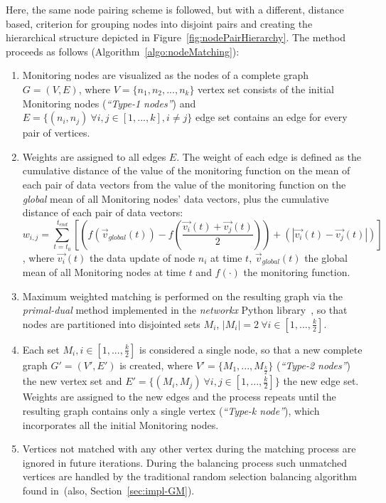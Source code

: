 Here, the same node pairing scheme is followed, but with a different, distance based, criterion for grouping nodes into disjoint pairs and creating the hierarchical structure depicted in Figure~\ref{fig:nodePairHierarchy}. The method proceeds as follows (Algorithm~\ref{algo:nodeMatching}):
\begin{enumerate}
\item Monitoring nodes are visualized as the nodes of a complete graph $G=(V,E)$, where $V=\{n_1, n_2, ... , n_k\}$ vertex set consists of the initial Monitoring nodes (\emph{``Type-1 nodes''}) and $E=\{(n_i, n_j)\ \forall i,j \in [1, ..., k], i \neq j\}$ edge set contains an edge for every pair of vertices.
\item Weights are assigned to all edges $E$. The weight of each edge is defined as the cumulative distance of the value of the monitoring function on the mean of each pair of data vectors from the value of the monitoring function on the \emph{global} mean of all Monitoring nodes' data vectors, plus the cumulative distance of each pair of data vectors:
\begin{equation}
w_{i,j}=
\sum_{t=t_0}^{t_{end}}{[(f(\vec{v}_{global}(t))-f(\frac{\vec{v_i}(t)+\vec{v_j}(t)}{2}))+(|\vec{v_i}(t)-\vec{v_j}(t)|)]}
\label{form:distanceMatchingWeights}
\end{equation}
, where $\vec{v_i}(t)$ the data update of node $n_i$ at time $t$, $\vec{v}_{global}(t)$ the global mean of all Monitoring nodes at time $t$ and $f(\cdot)$ the monitoring function.

\item Maximum weighted matching is performed on the resulting graph via the \emph{primal-dual} method implemented in the \emph{networkx} Python library~\cite{networkxMaxWeight}, so that nodes are partitioned into disjointed sets $M_i$, $|M_i|=2\ \forall i \in [1, ..., \frac{k}{2}]$. 

\item Each set $M_i, i \in [1, ..., \frac{k}{2}]$ is considered a single node, so that a new complete graph $G'=(V', E')$ is created, where $V'=\{M_1, ..., M_{\frac{k}{2}}\}$ (\emph{``Type-2 nodes''}) the new vertex set and $E'=\{(M_i, M_j)\ \forall i,j \in [1, ..., \frac{k}{2}]\}$ the new edge set. Weights are assigned to the new edges and the process repeats until the resulting graph contains only a single vertex (\emph{``Type-k node''}), which incorporates all the initial Monitoring nodes.

\item Vertices not matched with any other vertex during the matching process are ignored in future iterations. During the balancing process such unmatched vertices are handled by the traditional random selection balancing algorithm found in~\cite{Sharfman2006GM}(also, Section~\ref{sec:impl-GM}). 
\end{enumerate} 
